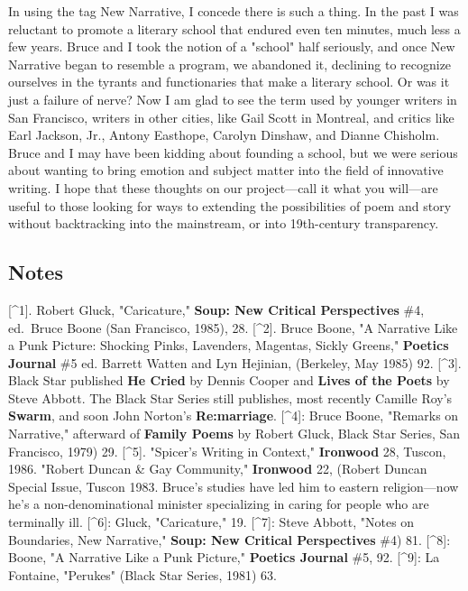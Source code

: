 In using the tag New Narrative, I concede there is such a thing. In the
past I was reluctant to promote a literary school that endured even ten
minutes, much less a few years. Bruce and I took the notion of a
"school" half seriously, and once New Narrative began to resemble a
program, we abandoned it, declining to recognize ourselves in the
tyrants and functionaries that make a literary school. Or was it just a
failure of nerve? Now I am glad to see the term used by younger writers
in San Francisco, writers in other cities, like Gail Scott in Montreal,
and critics like Earl Jackson, Jr., Antony Easthope, Carolyn Dinshaw,
and Dianne Chisholm. Bruce and I may have been kidding about founding a
school, but we were serious about wanting to bring emotion and subject
matter into the field of innovative writing. I hope that these thoughts
on our project---call it what you will---are useful to those looking for
ways to extending the possibilities of poem and story without
backtracking into the mainstream, or into 19th-century transparency.

\hypertarget{notes}{%
\subsection{Notes}\label{notes}}

{[}\^{}1{]}. Robert Gluck, "Caricature," \textbf{Soup: New Critical
Perspectives} \#4, ed.~Bruce Boone (San Francisco, 1985), 28.
{[}\^{}2{]}. Bruce Boone, "A Narrative Like a Punk Picture: Shocking
Pinks, Lavenders, Magentas, Sickly Greens," \textbf{Poetics Journal} \#5
ed. Barrett Watten and Lyn Hejinian, (Berkeley, May 1985) 92.
{[}\^{}3{]}. Black Star published \textbf{He Cried} by Dennis Cooper and
\textbf{Lives of the Poets} by Steve Abbott. The Black Star Series still
publishes, most recently Camille Roy's \textbf{Swarm}, and soon John
Norton's \textbf{Re:marriage}. {[}\^{}4{]}: Bruce Boone, "Remarks on
Narrative," afterward of \textbf{Family Poems} by Robert Gluck, Black
Star Series, San Francisco, 1979) 29. {[}\^{}5{]}. "Spicer's Writing in
Context," \textbf{Ironwood} 28, Tuscon, 1986. "Robert Duncan \& Gay
Community," \textbf{Ironwood} 22, (Robert Duncan Special Issue, Tuscon
1983. Bruce's studies have led him to eastern religion---now he's a
non-denominational minister specializing in caring for people who are
terminally ill. {[}\^{}6{]}: Gluck, "Caricature," 19. {[}\^{}7{]}: Steve
Abbott, "Notes on Boundaries, New Narrative," \textbf{Soup: New Critical
Perspectives} \#4) 81. {[}\^{}8{]}: Boone, "A Narrative Like a Punk
Picture," \textbf{Poetics Journal} \#5, 92. {[}\^{}9{]}: La Fontaine,
"Perukes" (Black Star Series, 1981) 63.

